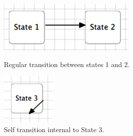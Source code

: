 \documentclass[11pt]{amsart}
\begin{document}
\begin{figure}

\begin{minipage}{.5\textwidth}
\begin{center}
\vspace{.2in}
\centerline {
\includegraphics[height=1in]{StatechartsImages/RegularTransition.png}
}
\caption{Regular transition between states 1 and 2.}
\label{fig:regularTransition}
\end{center}
\end{minipage}%
\begin{minipage}{.5\textwidth}
\begin{center}
\vspace{.2in}
\centerline {
\includegraphics[height=1in]{StatechartsImages/SelfTransition.png}
}
\caption{Self transition internal to State 3.}
\label{fig:selfTransition}
\end{center}
\end{minipage}

\end{figure}
\end{document}
